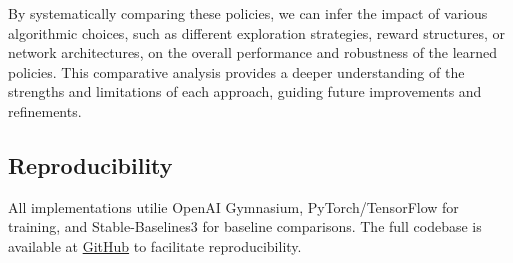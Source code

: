 \documentclass[../CSC_52081_EP.tex]{subfiles}
\begin{document}
By systematically comparing these policies, we can infer the impact of various algorithmic choices, such as different exploration strategies, reward structures, or network architectures, on the overall performance and robustness of the learned policies. This comparative analysis provides a deeper understanding of the strengths and limitations of each approach, guiding future improvements and refinements.


\subsection{Reproducibility}
All implementations utilie OpenAI Gymnasium, PyTorch/TensorFlow for training, and Stable-Baselines3 for baseline comparisons. The full codebase is available at \href{https://github.com/tr0fin0/ensta_CSC_52081_EP_project}{GitHub} to facilitate reproducibility.
\end{document}
